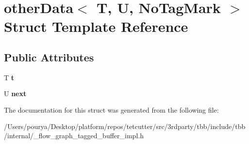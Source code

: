 \hypertarget{structotherData}{}\section{other\+Data$<$ T, U, No\+Tag\+Mark $>$ Struct Template Reference}
\label{structotherData}
\subsection*{Public Attributes}
\begin{DoxyCompactItemize}
\item 
\hypertarget{structotherData_a512b121e5fd826620b0da7d888e2795e}{}T {\bfseries t}\label{structotherData_a512b121e5fd826620b0da7d888e2795e}

\item 
\hypertarget{structotherData_a83b8c3d9d9e7939bc74fe0d33e56d977}{}U {\bfseries next}\label{structotherData_a83b8c3d9d9e7939bc74fe0d33e56d977}

\end{DoxyCompactItemize}


The documentation for this struct was generated from the following file\+:\begin{DoxyCompactItemize}
\item 
/\+Users/pourya/\+Desktop/platform/repos/tetcutter/src/3rdparty/tbb/include/tbb/internal/\+\_\+flow\+\_\+graph\+\_\+tagged\+\_\+buffer\+\_\+impl.\+h\end{DoxyCompactItemize}
